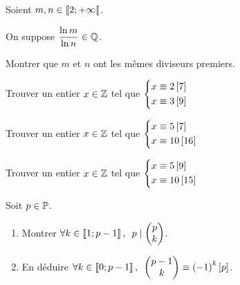 \begin{corr}
\end{corr}

\begin{exo}[Exercice 10]
Soient \(m,n\in\left\llbracket2;+\infty\right\llbracket\).

On suppose \(\dfrac{\ln m}{\ln n}\in\mathbb{Q}\).

Montrer que \(m\) et \(n\) ont les mêmes diviseurs premiers.
\end{exo}

\begin{corr}
\end{corr}

\begin{exo}[Exercice 11]
Trouver un entier \(x\in\mathbb{Z}\) tel que \(\begin{dcases}x\equiv2\left[7\right] \\ x\equiv3\left[9\right]\end{dcases}\)
\end{exo}

\begin{corr}
\end{corr}

\begin{exo}[Exercice 12]
Trouver un entier \(x\in\mathbb{Z}\) tel que \(\begin{dcases}x\equiv5\left[7\right] \\ x\equiv10\left[16\right]\end{dcases}\)
\end{exo}

\begin{corr}
\end{corr}

\begin{exo}[Exercice 13]
Trouver un entier \(x\in\mathbb{Z}\) tel que \(\begin{dcases}x\equiv5\left[9\right] \\ x\equiv10\left[15\right]\end{dcases}\)
\end{exo}

\begin{corr}
\end{corr}

\begin{exo}[Exercice 14]
Soit \(p\in\mathbb{P}\).

\begin{enumerate}
\item Montrer \(\quantifs{\forall k\in\interventierii{1}{p-1}}p\divise\binom{k}{p}\). \\

\item En déduire \(\quantifs{\forall k\in\interventierii{0}{p-1}}\binom{k}{p-1}\equiv\paren{-1}^k\croch{p}\).
\end{enumerate}
\end{exo}

